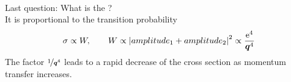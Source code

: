 \begin{example}
\begin{align*}
    \end{align*}
    Last question: What is the ?\\
    It is proportional to the transition probability
    \begin{align}
        \sigma \propto W, \qquad W \propto \qty| amplitude_1 + amplitude_2 |^2 \propto \frac{\mathrm{e}^4}{{\bm{q}}^4}
    \end{align}
    The factor $\nicefrac{1}{{\bm{q}}^4}$ leads to a rapid decrease of the cross section as momentum transfer increases.
    \begin{center}
    \end{center}
\end{example}